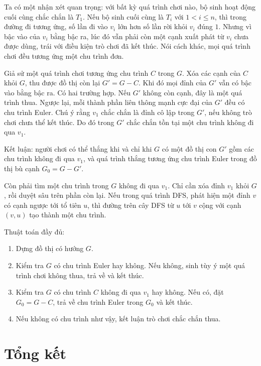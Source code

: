 \documentclass[11pt]{article}
\begin{document}
Ta có một nhận xét quan trọng: với bất kỳ quá trình chơi nào, bộ sinh hoạt
động cuối cùng chắc chắn là \(T_1\). Nếu bộ sinh cuối cùng là \(T_i\) với
\(1<i\le n\), thì trong đường đi tương ứng, số lần đi vào \(v_i\) lớn hơn số
lần rời khỏi \(v_i\) đúng \(1\). Nhưng vì bậc vào của \(v_i\) bằng bậc ra, lúc
đó vẫn phải còn một cạnh xuất phát từ \(v_i\) chưa được dùng, trái với điều
kiện trò chơi đã kết thúc. Nói cách khác, mọi quá trình chơi đều tương ứng một
chu trình đơn.

Giả sử một quá trình chơi tương ứng chu trình \(C\) trong \(G\). Xóa các cạnh
của \(C\) khỏi \(G\), thu được đồ thị còn lại \(G'=G-C\). Khi đó mọi đỉnh của
\(G'\) vẫn có bậc vào bằng bậc ra. Có hai trường hợp. Nếu \(G'\) không còn
cạnh, đây là một quá trình thua. Ngược lại, mỗi thành phần liên thông mạnh cực
đại của \(G'\) đều có chu trình Euler. Chú ý rằng \(v_1\) chắc chắn là đỉnh cô
lập trong \(G'\), nếu không trò chơi chưa thể kết thúc. Do đó trong \(G'\)
chắc chắn tồn tại một chu trình không đi qua \(v_1\).

Kết luận: người chơi có thể thắng khi và chỉ khi \(G\) có một đồ thị con
\(G'\) gồm các chu trình không đi qua \(v_1\), và quá trình thắng tương ứng
chu trình Euler trong đồ thị bù cạnh \(G_0=G-G'\).

Còn phải tìm một chu trình trong \(G\) không đi qua \(v_1\). Chỉ cần xóa đỉnh
\(v_1\) khỏi \(G\), rồi duyệt sâu trên phần còn lại. Nếu trong quá trình DFS,
phát hiện một đỉnh \(v\) có cạnh ngược tới tổ tiên \(u\), thì đường trên cây
DFS từ \(u\) tới \(v\) cộng với cạnh \((v,u)\) tạo thành một chu trình.

Thuật toán đầy đủ:
\begin{enumerate}
  \item Dựng đồ thị có hướng \(G\).
  \item Kiểm tra \(G\) có chu trình Euler hay không. Nếu không, sinh tùy ý một
  quá trình chơi không thua, trả về và kết thúc.
  \item Kiểm tra \(G\) có chu trình \(C\) không đi qua \(v_1\) hay không. Nếu
  có, đặt \(G_0=G-C\), trả về chu trình Euler trong \(G_0\) và kết thúc.
  \item Nếu không có chu trình như vậy, kết luận trò chơi chắc chắn thua.
\end{enumerate}

\section{Tổng kết}
\end{document}
